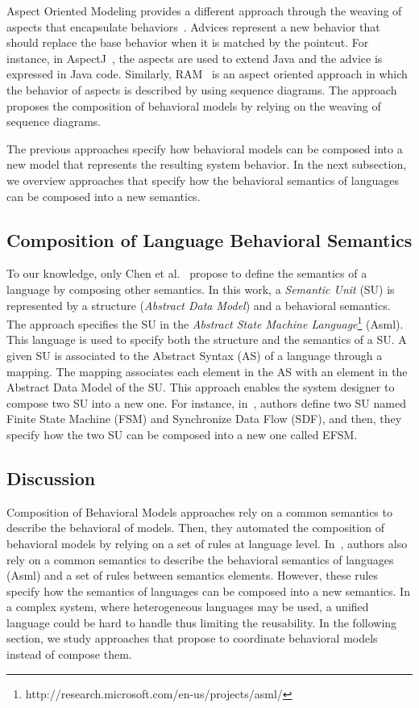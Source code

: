 Aspect Oriented Modeling provides a different approach through the weaving of aspects that encapsulate behaviors~\cite{weavingbib}. Advices represent a new behavior that should replace the base behavior when it is matched by the pointcut. For instance, in AspectJ~\cite{AspectJoverview}, the aspects are used to extend Java and the advice is expressed in Java code. Similarly, RAM~\cite{rambib,composdbib} is an aspect oriented approach in which the behavior of aspects is described by using sequence diagrams. The approach proposes the composition of behavioral models by relying on the weaving of sequence diagrams.

The previous approaches specify how behavioral models can be composed into a new model that represents the resulting system behavior. In the next subsection, we overview approaches that specify how the behavioral semantics of languages can be composed into a new semantics.

\subsection{Composition of Language Behavioral Semantics}
To our knowledge, only Chen et al.~\cite{semanticsanchoring} propose to define the semantics of a language by composing other semantics. In this work, a \emph{Semantic Unit} (SU) is represented by a structure (\emph{Abstract Data Model}) and a behavioral semantics. The approach specifies the SU in the \emph{Abstract State Machine Language}\footnote{http://research.microsoft.com/en-us/projects/asml/} (Asml). This language is used to specify both the structure and the semantics of a SU. A given SU is associated to the Abstract Syntax (AS) of a language through a mapping. The mapping associates each element in the AS with an element in the Abstract Data Model of the SU. This approach  enables the system designer to compose two SU into a new one. For instance, in~\cite{composemanticanch}, authors define two SU named Finite State Machine (FSM) and Synchronize Data Flow (SDF), and then, they specify how the two SU can be composed into a new one called EFSM.  

\subsection{Discussion}
Composition of Behavioral Models approaches rely on a common semantics to describe the behavioral of models. Then, they automated the composition of behavioral models by relying on a set of rules at language level. In~\cite{semanticsanchoring}, authors also rely on a common semantics to describe the behavioral semantics of languages (\eg Asml) and a set of rules between semantics elements. However, these rules specify how the semantics of languages can be composed into a new semantics. In a complex system, where heterogeneous languages may be used, a unified language could be hard to handle thus limiting the reusability.
In the following section, we study approaches that propose to coordinate behavioral models instead of compose them.  